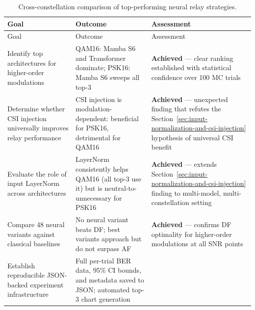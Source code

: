 \begin{longtable}[]{@{}
  >{\raggedright\arraybackslash}p{}
  >{\raggedright\arraybackslash}p{}
  >{\raggedright\arraybackslash}p{}@{}}
\caption{Cross-constellation comparison of top-performing neural relay strategies.}\label{tbl:table21}\tabularnewline
\toprule\noalign{}
\begin{minipage}[b]{\linewidth}\raggedright
Goal
\end{minipage} & \begin{minipage}[b]{\linewidth}\raggedright
Outcome
\end{minipage} & \begin{minipage}[b]{\linewidth}\raggedright
Assessment
\end{minipage} \\
\midrule\noalign{}
\endfirsthead
\toprule\noalign{}
\begin{minipage}[b]{\linewidth}\raggedright
Goal
\end{minipage} & \begin{minipage}[b]{\linewidth}\raggedright
Outcome
\end{minipage} & \begin{minipage}[b]{\linewidth}\raggedright
Assessment
\end{minipage} \\
\midrule\noalign{}
\endhead
\bottomrule\noalign{}
\endlastfoot
Identify top architectures for higher-order modulations & QAM16: Mamba S6 and Transformer dominate; PSK16: Mamba S6 sweeps all top-3 & \textbf{Achieved} --- clear ranking established with statistical confidence over 100 MC trials \\
Determine whether CSI injection universally improves relay performance & CSI injection is modulation-dependent: beneficial for PSK16, detrimental for QAM16 & \textbf{Achieved} --- unexpected finding that refutes the Section~\ref{sec:input-normalization-and-csi-injection} hypothesis of universal CSI benefit \\
Evaluate the role of input LayerNorm across architectures & LayerNorm consistently helps QAM16 (all top-3 use it) but is neutral-to-unnecessary for PSK16 & \textbf{Achieved} --- extends Section~\ref{sec:input-normalization-and-csi-injection} finding to multi-model, multi-constellation setting \\
Compare 48 neural variants against classical baselines & No neural variant beats DF; best variants approach but do not surpass AF & \textbf{Achieved} --- confirms DF optimality for higher-order modulations at all SNR points \\
Establish reproducible JSON-backed experiment infrastructure & Full per-trial BER data, 95\% CI bounds, and metadata saved to JSON; automated top-3 chart generation & \\
\end{longtable}

